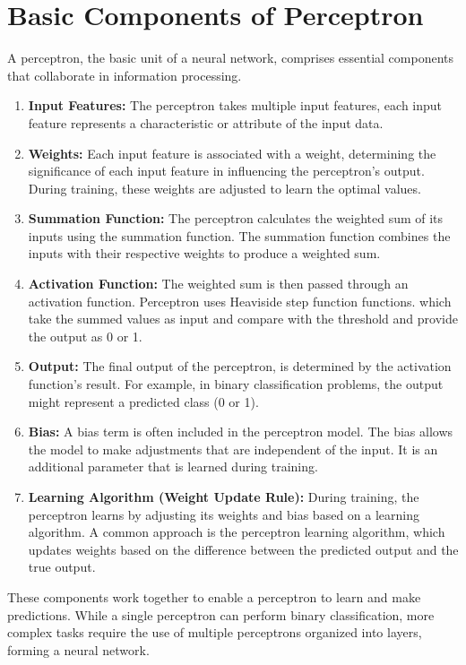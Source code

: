\section{Basic Components of Perceptron}
    A perceptron, the basic unit of a neural network, comprises essential components that collaborate in information processing.
    \begin{enumerate}
        \item \textbf{Input Features:} The perceptron takes multiple input features, each input feature represents a characteristic or attribute of the input data.
        \item \textbf{Weights:} Each input feature is associated with a weight, determining the significance of each input feature in influencing the perceptron’s output. During training, these weights are adjusted to learn the optimal values.
        \item \textbf{Summation Function:} The perceptron calculates the weighted sum of its inputs using the summation function. The summation function combines the inputs with their respective weights to produce a weighted sum.
        \item \textbf{Activation Function:} The weighted sum is then passed through an activation function. Perceptron uses Heaviside step function functions. which take the summed values as input and compare with the threshold and provide the output as 0 or 1.
        \item \textbf{Output:} The final output of the perceptron, is determined by the activation function’s result. For example, in binary classification problems, the output might represent a predicted class (0 or 1).
        \item \textbf{Bias:} A bias term is often included in the perceptron model. The bias allows the model to make adjustments that are independent of the input. It is an additional parameter that is learned during training.
        \item \textbf{Learning Algorithm (Weight Update Rule):} During training, the perceptron learns by adjusting its weights and bias based on a learning algorithm. A common approach is the perceptron learning algorithm, which updates weights based on the difference between the predicted output and the true output.
    \end{enumerate}
    These components work together to enable a perceptron to learn and make predictions. While a single perceptron can perform binary classification, more complex tasks require the use of multiple perceptrons organized into layers, forming a neural network.
